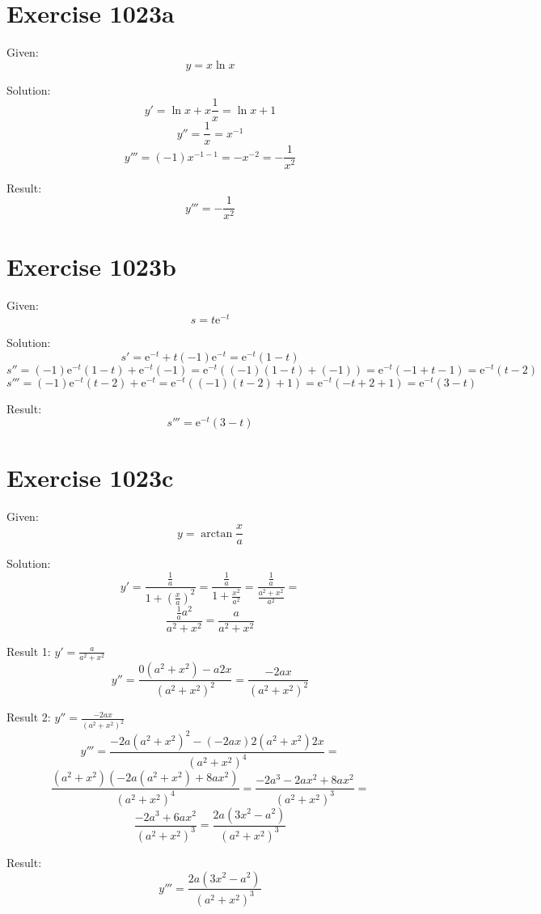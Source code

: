 \documentclass[a4paper, 10pt]{scrartcl}
\newcommand*\euler{\mathrm{e}}
\begin{document}
\section{Exercise 1023a}

Given:
\[
y = x\ln{x}
\]

Solution:
\[
y' = \ln{x} + x\frac{1}{x} = \ln{x} + 1
\]
\[
y'' = \frac{1}{x} = x^{-1}
\]
\[
y''' = (-1)x^{-1 - 1} = -x^{-2} = -\frac{1}{x^{2}}
\]

Result:
\[
y''' = -\frac{1}{x^{2}}
\]

\section{Exercise 1023b}

Given:
\[
s = t\euler^{-t}
\]

Solution:
\[
s' = \euler^{-t} + t(-1)\euler^{-t} = \euler^{-t}(1 - t)
\]
\[
s'' = (-1)\euler^{-t}(1 - t) + \euler^{-t}(-1) = \euler^{-t}((-1)(1 - t) + (-1)) = \euler^{-t}(-1 + t - 1) = \euler^{-t}(t - 2)
\]
\[
s''' = (-1)\euler^{-t}(t - 2) + \euler^{-t} = \euler^{-t}((-1)(t - 2) + 1) = \euler^{-t}(-t + 2 + 1) = \euler^{-t}(3 - t)
\]

Result:
\[
s''' = \euler^{-t}(3 - t)
\]

\section{Exercise 1023c}

Given:
\[
y = \arctan{\frac{x}{a}}
\]

Solution:
\[
y' = \frac{\frac{1}{a}}{1 + \left(\frac{x}{a}\right)^{2}} = \frac{\frac{1}{a}}{1 + \frac{x^{2}}{a^{2}}} =
\frac{\frac{1}{a}}{\frac{a^{2} + x^{2}}{a^{2}}} =
\]
\[
\frac{\frac{1}{a}a^{2}}{a^{2} + x^{2}} = \frac{a}{a^{2} + x^{2}}
\]

Result 1: $y' = \frac{a}{a^{2} + x^{2}}$\\

\[
y'' = \frac{0(a^{2} + x^{2}) - a2x}{(a^{2} + x^{2})^{2}} = \frac{-2ax}{(a^{2} + x^{2})^{2}}
\]

Result 2: $y'' = \frac{-2ax}{(a^{2} + x^{2})^{2}}$\\

\[
y''' = \frac{-2a(a^{2} + x^{2})^{2} - (-2ax)2(a^{2} + x^{2})2x}{(a^{2} + x^{2})^{4}} =
\]
\[
\frac{(a^{2} + x^{2})(-2a(a^{2} + x^{2}) + 8ax^{2})}{(a^{2} + x^{2})^{4}} = \frac{-2a^{3} - 2ax^{2} + 8ax^{2}}{(a^{2} + x^{2})^{3}} =
\]
\[
\frac{-2a^{3} + 6ax^{2}}{(a^{2} + x^{2})^{3}} = \frac{2a(3x^{2} - a^{2})}{(a^{2} + x^{2})^{3}}
\]

Result:
\[
y''' = \frac{2a(3x^{2} - a^{2})}{(a^{2} + x^{2})^{3}}
\]
\end{document}
